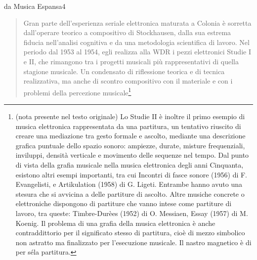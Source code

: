 da Musica Espansa4

\begin{quote}
	Gran parte dell’esperienza seriale elettronica maturata a Colonia è sorretta dall’operare teorico a compositivo di Stockhausen, dalla sua estrema fiducia nell’analisi cognitiva e da una metodologia scientifica di lavoro. Nel periodo dal 1953 al 1954, egli realizza alla WDR i pezzi elettronici Studie I e II, che rimangono tra i progetti musicali più rappresentativi di quella stagione musicale. Un condensato di riflessione teorica e di tecnica realizzativa, ma anche di scontro compositivo con il materiale e con i problemi della percezione musicale\footnote{(nota presente nel testo originale) Lo Studie II è inoltre il primo esempio di musica elettronica rappresentata da una partitura, un tentativo riuscito di creare una mediazione tra gesto formale e ascolto, mediante una descrizione grafica puntuale dello spazio sonoro: ampiezze, durate, misture frequenziali, inviluppi, densità verticale e movimento delle sequenze nel tempo. Dal punto di vista della grafia musicale nella musica elettronica degli anni Cinquanta, esistono altri esempi importanti, tra cui Incontri di fasce sonore (1956) di F. Evangelisti, e Artikulation (1958) di G. Ligeti. Entrambe hanno avuto una stesura che si avvicina a delle partiture di ascolto. Altre musiche concrete o elettroniche dispongono di partiture che vanno intese come partiture di lavoro, tra queste: Timbre-Durèes (1952) di O. Messiaen, Essay (1957) di M. Koenig. Il problema di una grafia della musica elettronica è anche contraddittorio per il significato stesso di partitura, cioè di mezzo simbolico non astratto ma finalizzato per l’esecuzione musicale. Il nastro magnetico è di per séla partitura.}


\end{quote}
